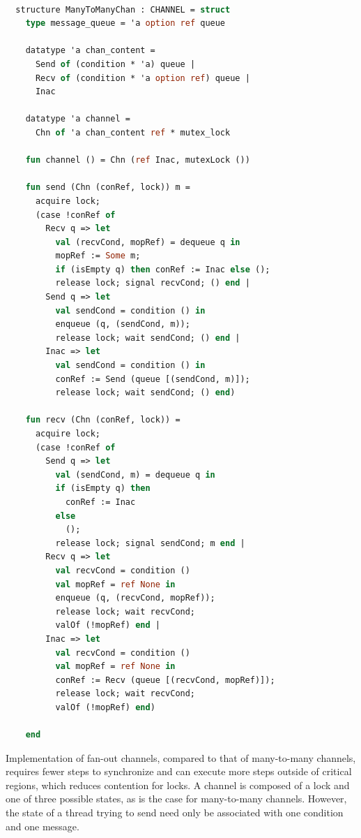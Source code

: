 \documentclass{article}
\begin{document}
\begin{lstlisting}[language=ML, escapechar=\%]

  structure ManyToManyChan : CHANNEL = struct
    type message_queue = 'a option ref queue

    datatype 'a chan_content = 
      Send of (condition * 'a) queue | 
      Recv of (condition * 'a option ref) queue | 
      Inac

    datatype 'a channel =
      Chn of 'a chan_content ref * mutex_lock 

    fun channel () = Chn (ref Inac, mutexLock ())

    fun send (Chn (conRef, lock)) m = 
      acquire lock;
      (case !conRef of
        Recv q => let
          val (recvCond, mopRef) = dequeue q in
          mopRef := Some m;
          if (isEmpty q) then conRef := Inac else (); 
          release lock; signal recvCond; () end |
        Send q => let
          val sendCond = condition () in
          enqueue (q, (sendCond, m));
          release lock; wait sendCond; () end |
        Inac => let
          val sendCond = condition () in
          conRef := Send (queue [(sendCond, m)]);
          release lock; wait sendCond; () end)

    fun recv (Chn (conRef, lock)) =  
      acquire lock;
      (case !conRef of 
        Send q => let
          val (sendCond, m) = dequeue q in
          if (isEmpty q) then
            conRef := Inac
          else
            (); 
          release lock; signal sendCond; m end |
        Recv q => let
          val recvCond = condition ()
          val mopRef = ref None in
          enqueue (q, (recvCond, mopRef));
          release lock; wait recvCond;
          valOf (!mopRef) end |
        Inac => let
          val recvCond = condition ()
          val mopRef = ref None in
          conRef := Recv (queue [(recvCond, mopRef)]);
          release lock; wait recvCond;
          valOf (!mopRef) end)

    end

  \end{lstlisting}


Implementation of fan-out channels, compared to that of many-to-many channels, requires fewer
steps to synchronize and can execute more steps outside of critical regions, which reduces
contention for locks.  A channel is composed of a lock and one of three possible states, as is
the case for many-to-many channels.  However, the state of a thread trying to send need only be
associated with one condition and one message.  
\end{document}
